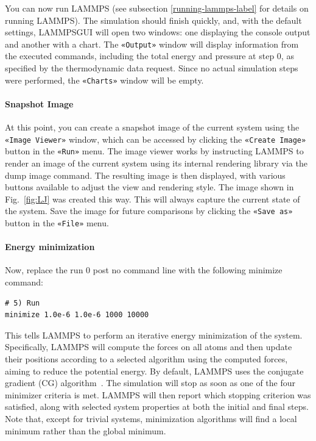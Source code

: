 \documentclass[9pt,tutorial]{livecoms}
\newcommand{\lmpcmd}[1]{\colorbox{listing}{\textcolor{command}{\small{#1}}}} %
\newcommand{\guicmd}[1]{\textcolor{command}{\texttt{«#1»}}} %
\newcommand{\lammpsgui}{\textsf{LAMMPS\textendash GUI}}
\begin{document}
You can now run LAMMPS (see subsection \ref{running-lammps-label}
for details on running LAMMPS).  The simulation should finish quickly, and, with the default
settings, \lammpsgui{} will open two windows: one displaying the console
output and another with a chart.  The \guicmd{Output} window will display information from
the executed commands, including the total energy and pressure at step 0,
as specified by the thermodynamic data request.  Since no actual simulation
steps were performed, the \guicmd{Charts} window will be empty.

\paragraph{Snapshot Image}

At this point, you can create a snapshot image of the current system
using the \guicmd{Image Viewer} window, which can be accessed by
clicking the \guicmd{Create Image} button in the \guicmd{Run} menu.  The
image viewer works by instructing LAMMPS to render an image of the
current system using its internal rendering library via the \lmpcmd{dump
  image} command.  The resulting image is then displayed, with various
buttons available to adjust the view and rendering style.  The image
shown in Fig.~\ref{fig:LJ} was created this way.  This will always
capture the current state of the system.  Save the image for future
comparisons by clicking the \guicmd{Save as} button
in the \guicmd{File} menu.

\paragraph{Energy minimization}

Now, replace the \lmpcmd{run 0 post no} command line with the
following \lmpcmd{minimize} command:
\begin{lstlisting}
# 5) Run
minimize 1.0e-6 1.0e-6 1000 10000
\end{lstlisting}
This tells LAMMPS to perform an iterative energy
minimization of the system.  Specifically, LAMMPS will compute the
forces on all atoms and then update their positions according to a
selected algorithm using the computed forces, aiming to reduce the
potential energy.  By default, LAMMPS uses the conjugate gradient (CG)
algorithm~\cite{hestenes1952methods}.  The simulation will stop as soon
as one of the four minimizer criteria is met.  LAMMPS
will then report which stopping criterion was satisfied, along with
selected system properties at both the initial and final steps.
Note that, except for trivial systems, minimization algorithms will find a
local minimum rather than the global minimum.
\end{document}
